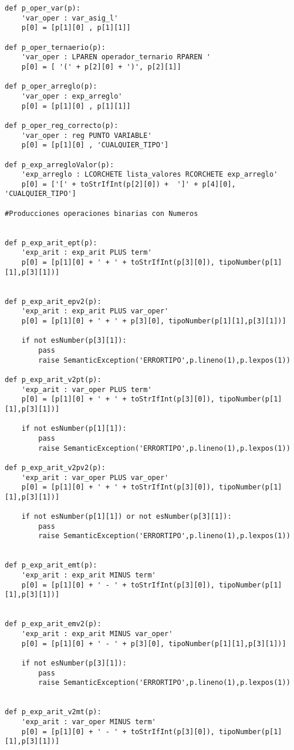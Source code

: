 \begin{verbatim}
def p_oper_var(p):
    'var_oper : var_asig_l'
    p[0] = [p[1][0] , p[1][1]]

def p_oper_ternaerio(p):
    'var_oper : LPAREN operador_ternario RPAREN '
    p[0] = [ '(' + p[2][0] + ')', p[2][1]]

def p_oper_arreglo(p):
    'var_oper : exp_arreglo'
    p[0] = [p[1][0] , p[1][1]]

def p_oper_reg_correcto(p):
    'var_oper : reg PUNTO VARIABLE'
    p[0] = [p[1][0] , 'CUALQUIER_TIPO']

def p_exp_arregloValor(p):
    'exp_arreglo : LCORCHETE lista_valores RCORCHETE exp_arreglo'
    p[0] = ['[' + toStrIfInt(p[2][0]) +  ']' + p[4][0], 'CUALQUIER_TIPO']

#Producciones operaciones binarias con Numeros


def p_exp_arit_ept(p):
    'exp_arit : exp_arit PLUS term'
    p[0] = [p[1][0] + ' + ' + toStrIfInt(p[3][0]), tipoNumber(p[1][1],p[3][1])]


def p_exp_arit_epv2(p):
    'exp_arit : exp_arit PLUS var_oper'
    p[0] = [p[1][0] + ' + ' + p[3][0], tipoNumber(p[1][1],p[3][1])]

    if not esNumber(p[3][1]):
        pass
        raise SemanticException('ERRORTIPO',p.lineno(1),p.lexpos(1))

def p_exp_arit_v2pt(p):
    'exp_arit : var_oper PLUS term'
    p[0] = [p[1][0] + ' + ' + toStrIfInt(p[3][0]), tipoNumber(p[1][1],p[3][1])]

    if not esNumber(p[1][1]):
        pass
        raise SemanticException('ERRORTIPO',p.lineno(1),p.lexpos(1))

def p_exp_arit_v2pv2(p):
    'exp_arit : var_oper PLUS var_oper'
    p[0] = [p[1][0] + ' + ' + toStrIfInt(p[3][0]), tipoNumber(p[1][1],p[3][1])]

    if not esNumber(p[1][1]) or not esNumber(p[3][1]):
        pass
        raise SemanticException('ERRORTIPO',p.lineno(1),p.lexpos(1))


def p_exp_arit_emt(p):
    'exp_arit : exp_arit MINUS term'
    p[0] = [p[1][0] + ' - ' + toStrIfInt(p[3][0]), tipoNumber(p[1][1],p[3][1])]


def p_exp_arit_emv2(p):
    'exp_arit : exp_arit MINUS var_oper'
    p[0] = [p[1][0] + ' - ' + p[3][0], tipoNumber(p[1][1],p[3][1])]

    if not esNumber(p[3][1]):
        pass
        raise SemanticException('ERRORTIPO',p.lineno(1),p.lexpos(1))


def p_exp_arit_v2mt(p):
    'exp_arit : var_oper MINUS term'
    p[0] = [p[1][0] + ' - ' + toStrIfInt(p[3][0]), tipoNumber(p[1][1],p[3][1])]


\end{verbatim}
